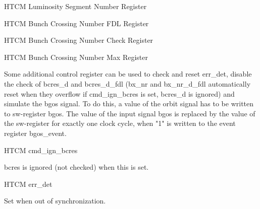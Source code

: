 \begin{register}{H}{TCM Luminosity Segment Number Register}{}%
	\begin{regdesc}
	\end{regdesc}
\end{register}
\begin{register}{H}{TCM Bunch Crossing Number FDL Register}{}%
	\begin{regdesc}
	\end{regdesc}
\end{register}
\begin{register}{H}{TCM Bunch Crossing Number Check Register}{}%
	\begin{regdesc}
	\end{regdesc}
\end{register}
\begin{register}{H}{TCM Bunch Crossing Number Max Register}{}%
	\begin{regdesc}
	\end{regdesc}
\end{register}

Some additional control register can be used to check and reset err\_det, disable the check of bcres\_d and bcres\_d\_fdl (bx\_nr and bx\_nr\_d\_fdl automatically reset when they overflow if cmd\_ign\_bcres is set, bcres\_d is ignored) and simulate the bgos signal. To do this, a value of the orbit signal has to be written to sw-register bgos. The value of the input signal bgos is replaced by the value of the sw-register for exactly one clock cycle, when "1" is written to the event register bgos\_event.

\begin{register}{H}{TCM cmd\_ign\_bcres}{}%
	\label{cmd_ign_bcres}%
	\regnewline%

	\begin{regdesc}
	\begin{reglist}
 		\item [cmd\_ign\_bcres] bcres is ignored (not checked) when this is set.
	\end{reglist}
	\end{regdesc}
\end{register}

\begin{register}{H}{TCM err\_det}{}%
	\label{err_det}%
	\regfield{err\_det}{1}{0}{0}%
	\regnewline%

	\begin{regdesc}
	\begin{reglist}
		\item [err\_det] Set when out of synchronization.
	\end{reglist}
	\end{regdesc}
\end{register}

